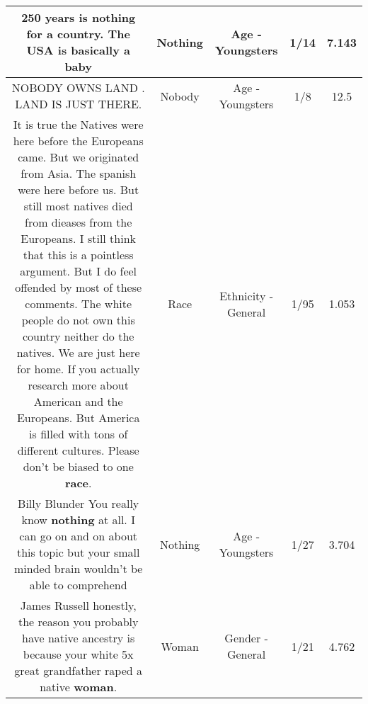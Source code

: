 \documentclass[11pt]{article}
\newlength\mylength
\begin{document}
\begin{center}
\begin{longtable}{|C{.65\mylength}|C{.30\mylength}|C{.12\mylength}|C{.12\mylength}|C{.12\mylength}|}
  \small {} 250 years is \textbf{nothing} for a country. The USA is basically a baby\normalsize   & Nothing & Age - Youngsters & 1/14 & 7.143 \\  \hline
  \small NOBODY OWNS LAND . LAND IS JUST THERE.\normalsize   & Nobody & Age - Youngsters & 1/8 & 12.5 \\  \hline
  \small It is true the Natives were here before the Europeans came. But we originated from Asia. The spanish were here before us. But still most natives died from dieases from the Europeans. I still think that this is a pointless argument. But I do feel offended by most of these comments. The white people do not own this country neither do the natives. We are just here for home. If you actually research more about American and the Europeans. But America is filled with tons of different cultures. Please don't be biased to one \textbf{race}.\normalsize   & Race & Ethnicity - General & 1/95 & 1.053 \\  \hline
  \small Billy Blunder You really know \textbf{nothing} at all. I can go on and on about this topic but your small minded brain wouldn't be able to comprehend\normalsize   & Nothing & Age - Youngsters & 1/27 & 3.704 \\  \hline
  \small James Russell honestly, the reason you probably have native ancestry is because your white 5x great grandfather raped a native \textbf{woman}.\normalsize   & Woman & Gender - General & 1/21 & 4.762 \\  \hline

\end{longtable}
\end{center}
\end{document}
